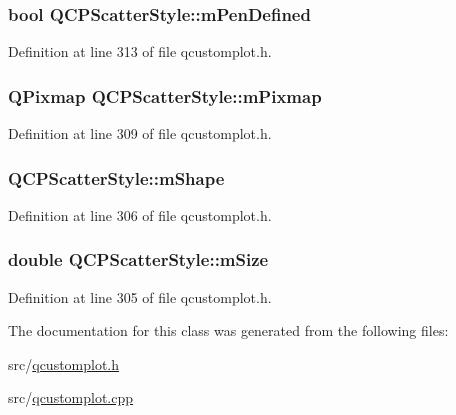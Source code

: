 \hypertarget{class_q_c_p_scatter_style_a84ef5aa591ddba07b440f597e1669e78}{
\subsubsection[{m\-Pen\-Defined}]{\setlength{\rightskip}{0pt plus 5cm}bool Q\-C\-P\-Scatter\-Style\-::m\-Pen\-Defined\hspace{0.3cm}{\ttfamily [protected]}}}\label{class_q_c_p_scatter_style_a84ef5aa591ddba07b440f597e1669e78}


Definition at line 313 of file qcustomplot.\-h.

\hypertarget{class_q_c_p_scatter_style_a7697346c89b19d4cd1d8dd33319ec9e3}{
\subsubsection[{m\-Pixmap}]{\setlength{\rightskip}{0pt plus 5cm}Q\-Pixmap Q\-C\-P\-Scatter\-Style\-::m\-Pixmap\hspace{0.3cm}{\ttfamily [protected]}}}\label{class_q_c_p_scatter_style_a7697346c89b19d4cd1d8dd33319ec9e3}


Definition at line 309 of file qcustomplot.\-h.

\hypertarget{class_q_c_p_scatter_style_af1b327f35f107ed108290187bbc8c7c6}{
\subsubsection[{m\-Shape}]{ Q\-C\-P\-Scatter\-Style\-::m\-Shape\hspace{0.3cm}{\ttfamily [protected]}}}\label{class_q_c_p_scatter_style_af1b327f35f107ed108290187bbc8c7c6}


Definition at line 306 of file qcustomplot.\-h.

\hypertarget{class_q_c_p_scatter_style_a757da98671eb06b221979373ac2cec91}{
\subsubsection[{m\-Size}]{\setlength{\rightskip}{0pt plus 5cm}double Q\-C\-P\-Scatter\-Style\-::m\-Size\hspace{0.3cm}{\ttfamily [protected]}}}\label{class_q_c_p_scatter_style_a757da98671eb06b221979373ac2cec91}


Definition at line 305 of file qcustomplot.\-h.



The documentation for this class was generated from the following files\-:\begin{DoxyCompactItemize}
\item 
src/\hyperlink{qcustomplot_8h}{qcustomplot.\-h}\item 
src/\hyperlink{qcustomplot_8cpp}{qcustomplot.\-cpp}\end{DoxyCompactItemize}

